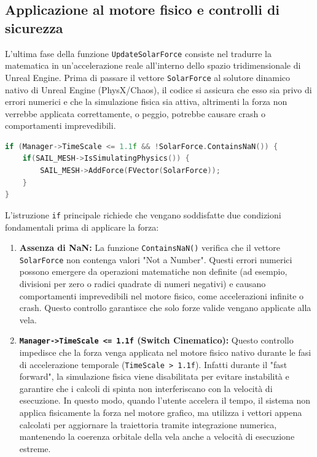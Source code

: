 
\subsection{Applicazione al motore fisico e controlli di sicurezza}

L'ultima fase della funzione \lstinline|UpdateSolarForce| consiste nel tradurre la matematica in un'accelerazione reale all'interno dello spazio tridimensionale di Unreal Engine. Prima di passare il vettore \lstinline|SolarForce| al solutore dinamico nativo di Unreal Engine (PhysX/Chaos), il codice si assicura che esso sia privo di errori numerici e che la simulazione fisica sia attiva, altrimenti la forza non verrebbe applicata correttamente, o peggio, potrebbe causare crash o comportamenti imprevedibili.

\begin{lstlisting}[language=C++, caption={Verifiche di sicurezza e applicazione della forza al Rigid Body.}]
if (Manager->TimeScale <= 1.1f && !SolarForce.ContainsNaN()) {
    if(SAIL_MESH->IsSimulatingPhysics()) {
        SAIL_MESH->AddForce(FVector(SolarForce));
    }
}
\end{lstlisting}

L'istruzione \lstinline|if| principale richiede che vengano soddisfatte due condizioni fondamentali prima di applicare la forza:
\begin{enumerate}
    \item \textbf{Assenza di NaN:} La funzione \lstinline|ContainsNaN()| verifica che il vettore \lstinline|SolarForce| non contenga valori "Not a Number". Questi errori numerici possono emergere da operazioni matematiche non definite (ad esempio, divisioni per zero o radici quadrate di numeri negativi) e causano comportamenti imprevedibili nel motore fisico, come accelerazioni infinite o crash. Questo controllo garantisce che solo forze valide vengano applicate alla vela.
    \item \textbf{\lstinline|Manager->TimeScale <= 1.1f| (Switch Cinematico):} Questo controllo impedisce che la forza venga applicata nel motore fisico nativo durante le fasi di accelerazione temporale (\lstinline|TimeScale > 1.1f|). Infatti durante il "fast forward", la simulazione fisica viene disabilitata per evitare instabilità e garantire che i calcoli di spinta non interferiscano con la velocità di esecuzione. In questo modo, quando l'utente accelera il tempo, il sistema non applica fisicamente la forza nel motore grafico, ma utilizza i vettori appena calcolati per aggiornare la traiettoria tramite integrazione numerica, mantenendo la coerenza orbitale della vela anche a velocità di esecuzione estreme.
\end{enumerate}

